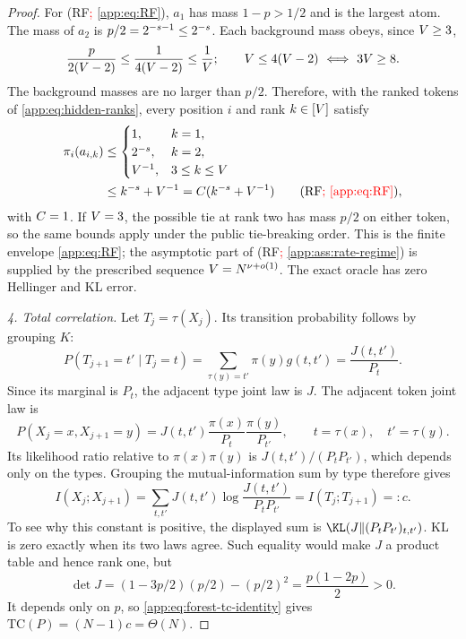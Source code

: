 \begin{proof}
For (RF\textcolor{red}{; \cref{app:eq:RF}}), $a_1$ has mass $1-p>1/2$ and is the largest atom.
The mass of $a_2$ is $p/2=2^{-s-1}\le2^{-s}$.
Each background mass obeys, since $V\ge3$,
\[
 \frac{p}{2(V-2)}
 \le\frac1{4(V-2)}
 \le\frac1{V};
 \qquad
 V\le4(V-2)
 \ \Longleftrightarrow\ 3V\ge8.
\]
The background masses are no larger than $p/2$.
Therefore, with the ranked tokens of \eqref{app:eq:hidden-ranks}, every
position $i$ and rank $k\in[V]$ satisfy
\begin{align*}
 \PosMarginal{i}(\RankedToken{i}{k})
 &\le
 \begin{cases}
  1,&k=1,\\
  2^{-\RankTailExponent},&k=2,\\
  \VocabSize^{-1},&3\le k\le\VocabSize
 \end{cases}
 \\
 &\le k^{-\RankTailExponent}+\VocabSize^{-1}
 =\FrequencyConstant(k^{-\RankTailExponent}+\VocabSize^{-1})
 \qquad\text{(RF\textcolor{red}{; \cref{app:eq:RF}})},
\end{align*}
with $C=1$.
If $V=3$, the possible tie at rank two has mass $p/2$ on
either token, so the same bounds apply under the public tie-breaking order.
This is the finite envelope \eqref{app:eq:RF}; the asymptotic part of
(RF\textcolor{red}{; \cref{app:ass:rate-regime}}) is supplied by the prescribed sequence
$V=N^{\nu+o(1)}$.
The exact oracle has zero Hellinger and KL error.

\emph{4. Total correlation.}
Let $T_j=\tau(X_j)$.  Its transition probability follows by grouping $K$:
\[
 P(T_{j+1}=t'\mid T_j=t)
 =\sum_{\tau(y)=t'}\pi(y)g(t,t')
 =\frac{J(t,t')}{P_t}.
\]
Since its marginal is $P_t$, the adjacent type joint law is $J$.
The adjacent token joint law is
\[
 P(X_j=x,X_{j+1}=y)
 =J(t,t')\frac{\pi(x)}{P_t}\frac{\pi(y)}{P_{t'}},
 \qquad t=\tau(x),\quad t'=\tau(y).
\]
Its likelihood ratio relative to $\pi(x)\pi(y)$ is
$J(t,t')/(P_tP_{t'})$, which depends only on the types.
Grouping the mutual-information sum by type therefore gives
\[
 I(X_j;X_{j+1})
 =\sum_{t,t'}J(t,t')\log\frac{J(t,t')}{P_tP_{t'}}
 =I(T_j;T_{j+1})=:c.
\]
\hypertarget{app-positive-pair-mi}{}
To see why this constant is positive, the displayed sum is
$\KLDivergence{J}{(P_tP_{t'})_{t,t'}}$.
KL is zero exactly when its two laws agree.  Such equality would make
$J$ a product table and hence rank one, but
\[
 \det J=(1-3p/2)(p/2)-(p/2)^2
       =\frac{p(1-2p)}2>0.
\]
It depends only on $p$, so \eqref{app:eq:forest-tc-identity} gives
$\mathrm{TC}(P)=(N-1)c=\Theta(N)$.


\end{proof}
